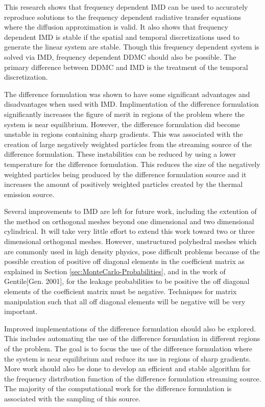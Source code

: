 \noindent
	\indent This research shows that frequency dependent IMD can be used to accurately reproduce solutions to the frequency dependent radiative transfer equations where the diffusion approximation is valid. It also shows that frequency dependent IMD is stable if the spatial and temporal discretizations used to generate the linear system are stable. Though this frequency dependent system is solved via IMD, frequency dependent DDMC should also be possible. The primary difference between DDMC and IMD is the treatment of the temporal discretization.
	
	The difference formulation was shown to have some significant advantages and disadvantages when used with IMD. Implimentation of the difference formulation significantly increases the figure of merit in regions of the problem where the system is near equilibrium. However, the difference formulation did become unstable in regions containing sharp gradients. This was associated with the creation of large negatively weighted particles from the streaming source of the difference formulation. These instabilities can be reduced by using a lower temperature for the difference formulation. This reduces the size of the negatively weighted particles being produced by the difference formulation source and it increases the amount of positively weighted particles created by the thermal emission source. 
	
	Several improvements to IMD are left for future work, including the extention of the method on orthogonal meshes beyond one dimensional and two dimensional cylindrical. It will take very little effort to extend this work toward two or three dimensional orthogonal meshes. However, unstructured polyhedral meshes which are commonly used in high density physics, pose difficult problems because of the possible creation of positive off diagonal elements in the coefficient matrix as explained in Section \ref{sec:MonteCarlo-Probabilities}, and in the work of Gentile[Gen. 2001], for the leakage probabilities to be positive the off diagonal elements of the coefficient matrix must be negative. Techniques for matrix manipulation such that all off diagonal elements will be negative will be very important. 

	Improved implementations of the difference formulation should also be explored. This includes automating the use of the difference formulation in different regions of the problem. The goal is to focus the use of the difference formulation where the system is near equilibrium and reduce its use in regions of sharp gradients. More work should also be done to develop an efficient and stable algorithm for the frequency distribution function of the difference formulation streaming source. The majority of the computational work for the difference formulation is associated with the sampling of this source. 









